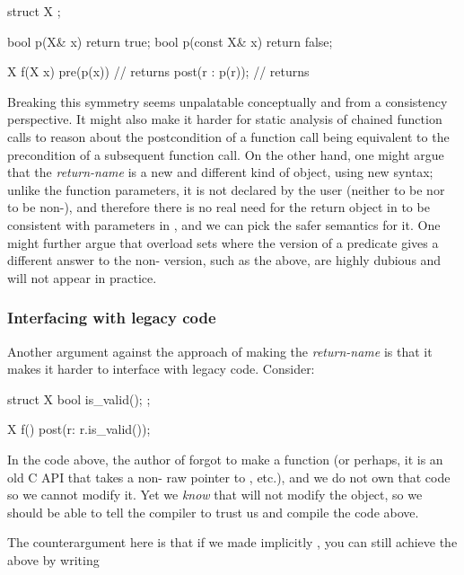 \begin{codeblock}
struct X {};

bool p(X& x)       { return true; }
bool p(const X& x) { return false; } 

X f(X x)
  pre(p(x))        // returns 
  post(r : p(r));  // returns 
\end{codeblock}

Breaking this symmetry seems unpalatable conceptually and from a consistency perspective. It might also make it harder for static analysis of chained function calls to reason about the postcondition of a function call being equivalent to the precondition of a subsequent function call. On the other hand, one might argue that the \emph{return-name} is a new and different kind of object, using new syntax; unlike the function parameters, it is not declared by the user (neither to be  nor to be non-), and therefore there is no real need for the return object in  to be consistent with parameters in , and we can pick the safer semantics for it. One might further argue that overload sets where the  version of a predicate gives a different answer to the non- version, such as the above, are highly dubious and will not appear in practice.

\subsubsection{Interfacing with legacy code}

Another argument against the approach of making the \emph{return-name}  is that it makes it harder to interface with legacy code. Consider:

\begin{codeblock}
struct X {
  bool is_valid();
};

X f()
  post(r: r.is_valid());
\end{codeblock}

In the code above, the author of  forgot to make  a  function (or perhaps, it is an old C API that takes a non- raw pointer to , etc.), and we do not own that code so we cannot modify it. Yet we \emph{know} that  will not modify the object, so we should be able to tell the compiler to trust us and compile the code above.

The counterargument here is that if we made  implicitly , you can still achieve the above by writing

